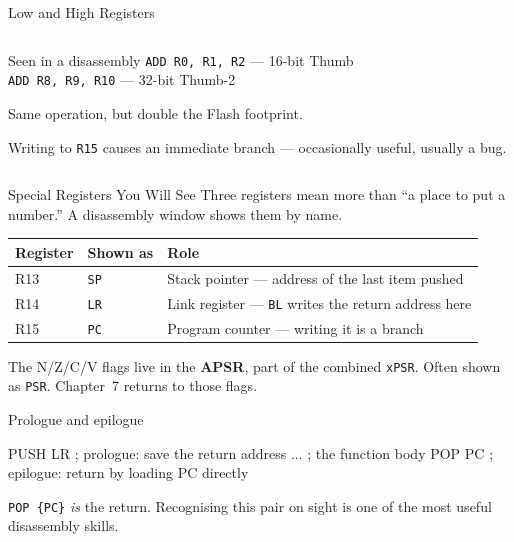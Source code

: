 \documentclass[9pt,aspectratio=169,xcolor=table]{beamer}
\begin{document}
\begin{frame}[plain]{Low and High Registers}
\begin{columns}[c]
\begin{column}{.5\textwidth}
        \vspace{3mm}
        \begin{block}{Seen in a disassembly}
            {\small \texttt{ADD R0, R1, R2} --- 16-bit Thumb\\
            \texttt{ADD R8, R9, R10} --- 32-bit Thumb-2}

            \vspace{1mm}
            {\small Same operation, but \alert{double} the Flash footprint.}
        \end{block}

        \vspace{3mm}
        {\small Writing to \texttt{R15} causes an immediate branch ---
        occasionally useful, usually a bug.}
    \end{column}
    \end{columns}
\end{frame}

\begin{frame}[fragile]{Special Registers You Will See}
    \leavevmode
    {\small Three registers mean more than ``a place to put a number.''
    A disassembly window shows them by name.}

    \vspace{2mm}
    \begin{center}
    {\small
    \striped
    \begin{tabular}{@{}l l R{.5\textwidth}@{}}
        \toprule
        \textbf{Register} & \textbf{Shown as} & \textbf{Role} \\
        \midrule
        R13 & \texttt{SP} & Stack pointer --- address of the last item pushed \\
        R14 & \texttt{LR} & Link register --- \texttt{BL} writes the return address here \\
        R15 & \texttt{PC} & Program counter --- writing it is a branch \\
        \bottomrule
    \end{tabular}}
    \end{center}

    \vspace{2mm}
    {\small The N/Z/C/V flags live in the \textbf{APSR}, part of the
    combined \texttt{xPSR}. Often shown as \texttt{PSR}. Chapter~7 returns
    to those flags.}

    \vspace{2mm}
    \begin{block}{Prologue and epilogue}
        \begin{asm}[basicstyle=\normalsize\ttfamily]
	PUSH {LR}    ; prologue: save the return address
	...          ; the function body
	POP  {PC}    ; epilogue: return by loading PC directly
        \end{asm}

        {\footnotesize \texttt{POP \{PC\}} \emph{is} the return. Recognising
        this pair on sight is one of the most useful disassembly skills.}
    \end{block}
\end{frame}
\end{document}
